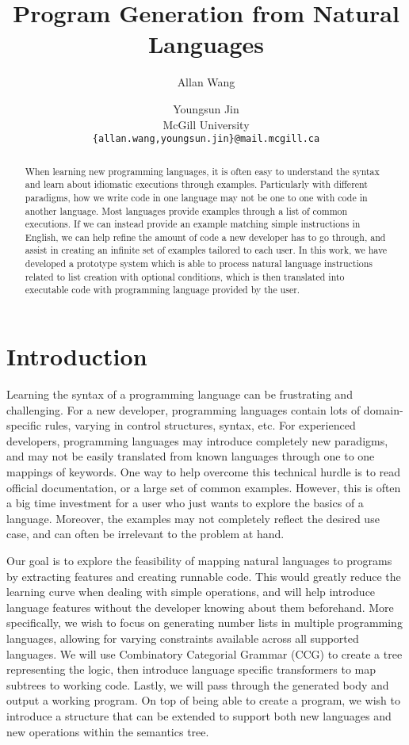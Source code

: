 \documentclass[11pt,letterpaper]{article}
\title{Program Generation from Natural Languages}
\author{Allan Wang \and Youngsun Jin \\
        McGill University \\ \tt{\{allan.wang,youngsun.jin\}@mail.mcgill.ca}}
\date{}
\begin{document}
\maketitle

\begin{abstract}
  When learning new programming languages, it is often easy to understand the syntax and learn
  about idiomatic executions through examples. Particularly with different paradigms, how we
  write code in one language may not be one to one with code in another language. Most
  languages provide examples through a list of common executions. If we can instead provide an
  example matching simple instructions in English, we can help refine the amount of code
  a new developer has to go through, and assist in creating an infinite set of examples tailored to
  each user. In this work, we have developed a prototype system which is able to process natural language instructions
  related to list creation with optional conditions, which is then translated into executable code with programming language provided by the user.
\end{abstract}

\section{Introduction}
Learning the syntax of a programming language can be frustrating and challenging. 
For a new developer, programming languages contain lots of domain-specific rules, varying in control structures, syntax, etc.
For experienced developers, programming languages may introduce completely new paradigms, and may not be easily translated from known languages through one to one mappings of keywords.
One way to help overcome this technical hurdle is to read official documentation, or a large set of common examples.
However, this is often a big time investment for a user who just wants to explore the basics of a language.
Moreover, the examples may not completely reflect the desired use case, and can often be irrelevant to the problem at hand.

Our goal is to explore the feasibility of mapping natural languages to programs by extracting features and creating runnable code.
This would greatly reduce the learning curve when dealing with simple operations, and will help introduce language features without the developer knowing about them beforehand.
More specifically, we wish to focus on generating number lists in multiple programming languages, allowing for varying constraints available across all supported languages.
We will use Combinatory Categorial Grammar (CCG) to create a tree representing the logic, then introduce language specific transformers to map subtrees to working code.
Lastly, we will pass through the generated body and output a working program.
On top of being able to create a program, we wish to introduce a structure that can be extended to support both new languages and new operations within the semantics tree.
\end{document}

